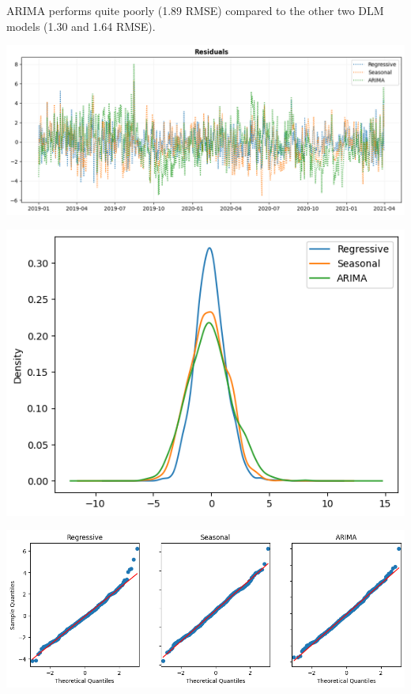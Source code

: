 \documentclass[a4paper,12pt]{article}
\begin{document}
ARIMA performs quite poorly (1.89 RMSE) compared to the other two DLM models (1.30 and 1.64 RMSE).

\begin{center}
\includegraphics[width=1.00\textwidth]{./images/bhopal/resid.png}
\end{center}

\begin{center}
\includegraphics[width=0.8\linewidth]{./images/bhopal/dist.png}
\end{center}

\begin{center}
\includegraphics[width=0.8\linewidth]{./images/bhopal/qq.png}
\end{center}

\pagebreak
\end{document}
